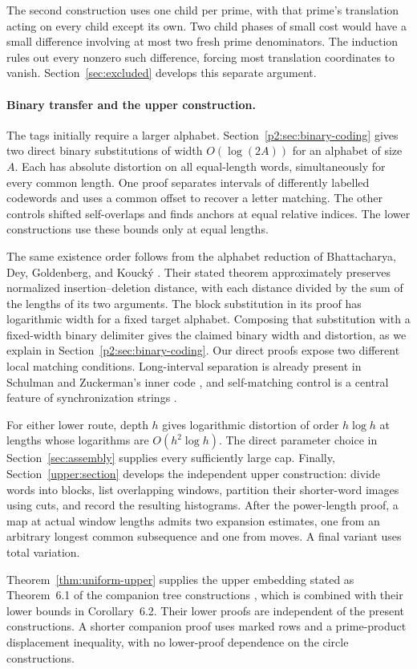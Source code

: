 The second construction uses one child per prime, with that prime's
translation acting on every child except its own. Two child phases of small
cost would have a small difference involving at most two fresh prime
denominators. The induction rules out every nonzero such difference, forcing
most translation coordinates to vanish. Section~\ref{sec:excluded} develops
this separate argument.

\paragraph{Binary transfer and the upper construction.}
The tags initially require a larger alphabet. Section~\ref{p2:sec:binary-coding}
gives two direct binary substitutions of width $O(\log(2A))$ for an alphabet
of size $A$. Each has absolute distortion on all equal-length words,
simultaneously for every common length. One proof separates intervals of
differently labelled codewords and uses a common offset to recover a letter
matching. The other controls shifted self-overlaps and finds anchors at equal
relative indices. The lower constructions use these bounds only at equal lengths.

The same existence order follows from the alphabet reduction of
Bhattacharya, Dey, Goldenberg, and Kouck\'y \cite[Theorem~1.1 and Section~3.2.1 of the full version]{BhattacharyaDeyGoldenbergKoucky2024}.
Their stated theorem approximately preserves normalized insertion--deletion
distance, with each distance divided by the sum of the lengths of its two
arguments. The block substitution in its proof has logarithmic width for a
fixed target alphabet. Composing that substitution
with a fixed-width binary delimiter gives the claimed binary width and
distortion, as we explain in Section~\ref{p2:sec:binary-coding}. Our direct proofs expose two different
local matching conditions. Long-interval separation is already present
in Schulman and Zuckerman's inner code \cite[Section~II-C]{SchulmanZuckerman1999},
and self-matching control is a central feature of synchronization strings
\cite{HaeuplerShahrasbi2017}.

For either lower route, depth $h$ gives logarithmic distortion of order
$h\log h$ at lengths whose logarithms are $O(h^2\log h)$. The direct
parameter choice in Section~\ref{sec:assembly} supplies every sufficiently
large cap. Finally, Section~\ref{upper:section} develops the independent
upper construction: divide words into blocks, list overlapping windows,
partition their shorter-word images using cuts, and record the resulting
histograms. After the power-length proof, a map at actual window lengths
admits two expansion estimates, one from an arbitrary longest common
subsequence and one from moves. A final variant uses total variation.

Theorem~\ref{thm:uniform-upper} supplies the upper embedding stated as
Theorem~6.1 of the companion tree constructions \cite{OpenAITree2026},
which is combined with their lower bounds in Corollary~6.2. Their lower
proofs are independent of the present constructions.
A shorter companion proof \cite{OpenAIMain2026} uses marked rows and a
prime-product displacement inequality, with no lower-proof dependence on
the circle constructions.
